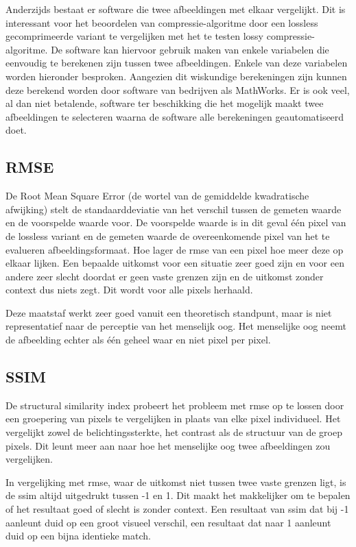 Anderzijds bestaat er software die twee afbeeldingen met elkaar vergelijkt. Dit is interessant voor het beoordelen van \gls{compressie-algoritme} door een \gls{lossless} gecomprimeerde variant te vergelijken met het te testen \gls{lossy} \gls{compressie-algoritme}. De software kan hiervoor gebruik maken van enkele variabelen die eenvoudig te berekenen zijn tussen twee afbeeldingen. Enkele van deze variabelen worden hieronder besproken. Aangezien dit wiskundige berekeningen zijn kunnen deze berekend worden door software van bedrijven als MathWorks. Er is ook veel, al dan niet betalende, software ter beschikking die het mogelijk maakt twee afbeeldingen te selecteren waarna de software alle berekeningen geautomatiseerd doet.

\subsection{RMSE}
\label{sec:kwaliteit-rmse}

De Root Mean Square Error (de wortel van de gemiddelde kwadratische afwijking) stelt de standaarddeviatie van het verschil tussen de gemeten waarde en de voorspelde waarde voor. De voorspelde waarde is in dit geval één pixel van de \gls{lossless} variant en de gemeten waarde de overeenkomende pixel van het te evalueren \gls{afbeeldingsformaat}. Hoe lager de \gls{rmse} van een pixel hoe meer deze op elkaar lijken. Een bepaalde uitkomst voor een situatie zeer goed zijn en voor een andere zeer slecht doordat er geen vaste grenzen zijn en de uitkomst zonder context dus niets zegt. Dit wordt voor alle pixels herhaald. 

Deze maatstaf werkt zeer goed vanuit een theoretisch standpunt, maar is niet representatief naar de perceptie van het menselijk oog. Het menselijke oog neemt de afbeelding echter als één geheel waar en niet pixel per pixel.

\subsection{SSIM}
\label{sec:kwaliteit-ssim}

De structural similarity index probeert het probleem met \gls{rmse} op te lossen door een groepering van pixels te vergelijken in plaats van elke pixel individueel. Het vergelijkt zowel de belichtingssterkte, het contrast als de structuur van de groep pixels. Dit leunt meer aan naar hoe het menselijke oog twee afbeeldingen zou vergelijken.

In vergelijking met \gls{rmse}, waar de uitkomst niet tussen twee vaste grenzen ligt, is de \gls{ssim} altijd uitgedrukt tussen -1 en 1. Dit maakt het makkelijker om te bepalen of het resultaat goed of slecht is zonder context. Een resultaat van \gls{ssim} dat bij -1 aanleunt duid op een groot visueel verschil, een resultaat dat naar 1 aanleunt duid op een bijna identieke match.

